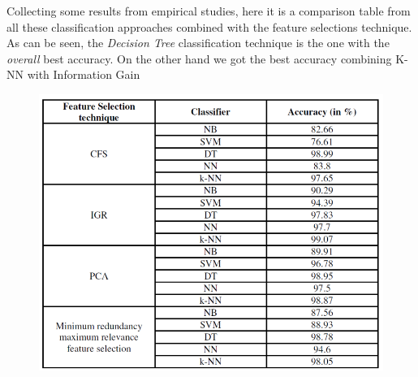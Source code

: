 Collecting some results from empirical studies, here it is a comparison table from all these classification approaches combined with the feature selections technique. As can be seen, the \emph{Decision Tree} classification technique is the one with the \emph{overall} best accuracy.\newline
On the other hand we got the best accuracy combining K-NN with Information Gain

\begin{figure}[h!]
	\centering
	\includegraphics[width=\textwidth]{img/Comparison.png}
\end{figure}